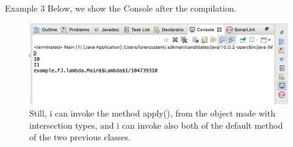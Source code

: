 \documentclass{beamer}
\begin{document}
\begin{frame}{Example 3}
Below, we show the Console after the compilation.
\begin{figure}
\centering
\includegraphics[width=1\linewidth]{images/downcast-java.png}
\caption{Still, i can invoke the method apply(), from the object made with intersection types, and i can invoke also both of the default method of the two previous classes.}
\label{fig:mainres}
\end{figure}
\end{frame}
\end{document}
